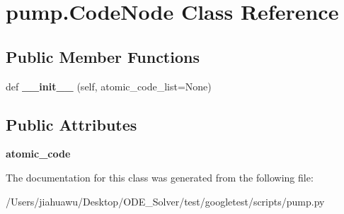 \hypertarget{classpump_1_1_code_node}{}\section{pump.\+Code\+Node Class Reference}
\label{classpump_1_1_code_node}
\subsection*{Public Member Functions}
\begin{DoxyCompactItemize}
\item 
\mbox{\label{classpump_1_1_code_node_a2ca8a75324a64e48004812d6c0bc1cbd}} 
def {\bfseries \+\_\+\+\_\+init\+\_\+\+\_\+} (self, atomic\+\_\+code\+\_\+list=None)
\end{DoxyCompactItemize}
\subsection*{Public Attributes}
\begin{DoxyCompactItemize}
\item 
\mbox{\label{classpump_1_1_code_node_ac7251110cc987c709e0e17d95521993e}} 
{\bfseries atomic\+\_\+code}
\end{DoxyCompactItemize}


The documentation for this class was generated from the following file\+:\begin{DoxyCompactItemize}
\item 
/\+Users/jiahuawu/\+Desktop/\+O\+D\+E\+\_\+\+Solver/test/googletest/scripts/pump.\+py\end{DoxyCompactItemize}
